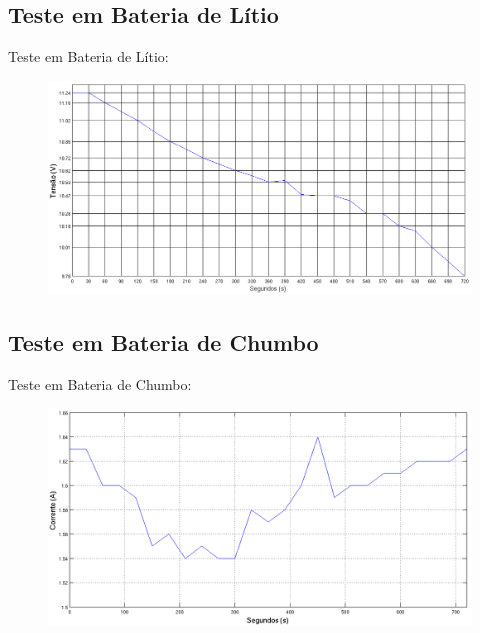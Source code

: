 \documentclass{beamer}
\begin{document}
\subsection{Teste em Bateria de Lítio}
\begin{frame}
  Teste em Bateria de Lítio:
        \begin{figure}
          \centering
          \includegraphics[width=1\linewidth]{energia_1}
        \end{figure}
\end{frame}

\subsection{Teste em Bateria de Chumbo}
\begin{frame}
  Teste em Bateria de Chumbo:
        \begin{figure}
          \centering
          \includegraphics[width=1\linewidth]{energia_2}
        \end{figure}
\end{frame}

\end{document}
